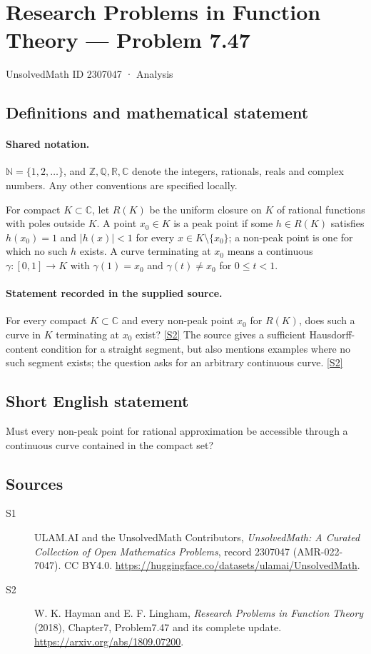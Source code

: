 \documentclass[11pt]{article}
\newcommand{\sref}[2]{\hyperlink{source:#1:#2}{[S#2]}}
\begin{document}
\setcounter{section}{2307046}
\section{Research Problems in Function Theory — Problem 7.47}\label{2307047}
{\small\sffamily UnsolvedMath ID 2307047 · Analysis}
\subsection{Definitions and mathematical statement}

\paragraph{Shared notation.}$\mathbb N=\{1,2,\ldots\}$, and $\mathbb Z,\mathbb Q,\mathbb R,\mathbb C$ denote the integers, rationals, reals and complex numbers. Any other conventions are specified locally.


For compact $K\subset\mathbb C$, let $R(K)$ be the uniform closure on $K$ of rational functions with poles outside $K$. A point $x_0\in K$ is a peak point if some $h\in R(K)$ satisfies $h(x_0)=1$ and $|h(x)|<1$ for every $x\in K\setminus\{x_0\}$; a non-peak point is one for which no such $h$ exists. A curve terminating at $x_0$ means a continuous $\gamma:[0,1]\to K$ with $\gamma(1)=x_0$ and $\gamma(t)\ne x_0$ for $0\le t<1$.

\paragraph{Statement recorded in the supplied source.}
For every compact $K\subset\mathbb C$ and every non-peak point $x_0$ for $R(K)$, does such a curve in $K$ terminating at $x_0$ exist? \sref{2307047}{2}
The source gives a sufficient Hausdorff-content condition for a straight segment, but also mentions examples where no such segment exists; the question asks for an arbitrary continuous curve. \sref{2307047}{2}
\subsection{Short English statement}
Must every non-peak point for rational approximation be accessible through a continuous curve contained in the compact set?
\subsection{Sources}
\begin{description}
\item[\hypertarget{source:2307047:1}{S1}] ULAM.AI and the UnsolvedMath Contributors, \emph{UnsolvedMath: A Curated Collection of Open Mathematics Problems}, record 2307047 (AMR-022-7047). CC BY4.0. \url{https://huggingface.co/datasets/ulamai/UnsolvedMath}.
\item[\hypertarget{source:2307047:2}{S2}] W. K. Hayman and E. F. Lingham, \emph{Research Problems in Function Theory} (2018), Chapter7, Problem7.47 and its complete update. \url{https://arxiv.org/abs/1809.07200}.
\end{description}
\label{end:2307047}
\end{document}

